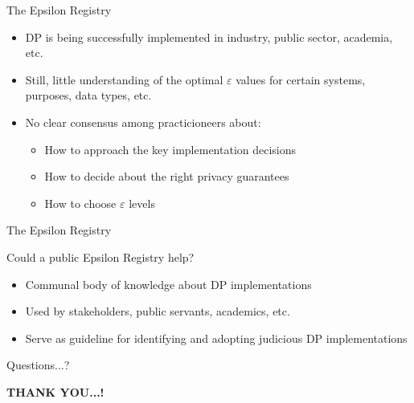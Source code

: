 \documentclass[12pt,aspectratio=169,handout]{beamer}
\begin{document}
\begin{frame}{The Epsilon Registry}

\begin{itemize} \setlength\itemsep{3mm}
%
\item DP is being successfully implemented in industry, public sector, academia, etc. 
%
\item Still, little understanding of the optimal $\varepsilon$ values for certain systems, purposes, data types, etc.
%
\item No clear consensus among practicioneers about:
%
	\begin{itemize} \setlength\itemsep{2mm}
	\item How to approach the key implementation decisions
	\item How to decide about the right privacy guarantees
	\item How to choose $\varepsilon$ levels 
	\end{itemize}
%
\end{itemize}


\end{frame}


\begin{frame}{The Epsilon Registry}

Could a public Epsilon Registry help?

\begin{itemize} \setlength\itemsep{3mm}
%
\item Communal body of knowledge about DP implementations
%
\item Used by stakeholders, public servants, academics, etc. 
%
\item Serve as guideline for identifying and adopting judicious DP implementations
%
\end{itemize}


\end{frame}


\begin{frame}{Questions...?}

\pause 

\centering
\textbf{THANK YOU...!}

\end{frame}

\end{document}
